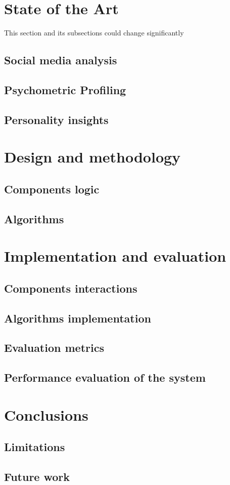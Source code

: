 \documentclass[epsfig,a4paper,11pt,titlepage,twoside,openany]{book}
\begin{document}
\raggedbottom  
{}



\clearpage
\newpage


\mainmatter
\tableofcontents


\clearpage
\newpage


\clearpage
\newpage



\chapter{State of the Art}
This section and its subsections could change significantly
\section{Social media analysis}
\section{Psychometric Profiling}
\section{Personality insights}
\newpage

\chapter{Design and methodology}
\section{Components logic}
\section{Algorithms}
\newpage

\chapter{Implementation and evaluation}
\section{Components interactions}
\section{Algorithms implementation}
\section{Evaluation metrics}
\section{Performance evaluation of the system}
\newpage

\chapter{Conclusions}
\section{Limitations}
\section{Future work}
\newpage

\printbibliography[heading=bibintoc, title={References}]
\end{document}
